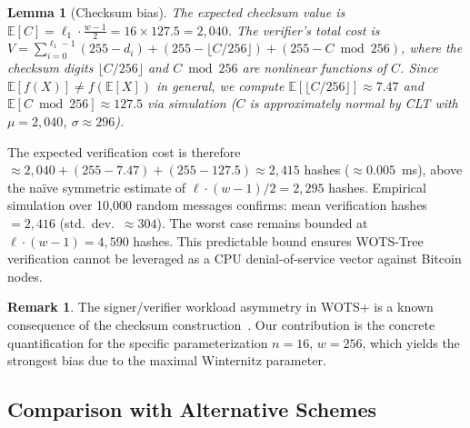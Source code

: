 \documentclass[11pt,a4paper]{article}
\newtheorem{lemma}[theorem]{Lemma}
\theoremstyle{definition}
\newtheorem{remark}[theorem]{Remark}
\begin{document}
\begin{lemma}[Checksum bias]
\label{lem:checksum}
The expected checksum value is $\mathbb{E}[C] = \ell_1 \cdot \frac{w-1}{2} = 16 \times 127.5 = 2{,}040$. The verifier's total cost is $V = \sum_{i=0}^{\ell_1-1}(255 - d_i) + (255 - \lfloor C/256 \rfloor) + (255 - C \bmod 256)$, where the checksum digits $\lfloor C/256 \rfloor$ and $C \bmod 256$ are nonlinear functions of $C$. Since $\mathbb{E}[f(X)] \neq f(\mathbb{E}[X])$ in general, we compute $\mathbb{E}[\lfloor C/256 \rfloor] \approx 7.47$ and $\mathbb{E}[C \bmod 256] \approx 127.5$ via simulation ($C$ is approximately normal by CLT with $\mu = 2{,}040$, $\sigma \approx 296$).
\end{lemma}

The expected verification cost is therefore $\approx 2{,}040 + (255 - 7.47) + (255 - 127.5) \approx 2{,}415$ hashes ($\approx 0.005$~ms), above the na\"ive symmetric estimate of $\ell \cdot (w-1)/2 = 2{,}295$ hashes. Empirical simulation over 10,000 random messages confirms: mean verification hashes $= 2{,}416$ (std.\ dev.\ $\approx 304$). The worst case remains bounded at $\ell \cdot (w - 1) = 4{,}590$ hashes. This predictable bound ensures WOTS-Tree verification cannot be leveraged as a CPU denial-of-service vector against Bitcoin nodes.

\begin{remark}
The signer/verifier workload asymmetry in WOTS+ is a known consequence of the checksum construction~\cite{hulsing2013wots,kudinov2025}. Our contribution is the concrete quantification for the specific parameterization $n = 16$, $w = 256$, which yields the strongest bias due to the maximal Winternitz parameter.
\end{remark}

\subsection{Comparison with Alternative Schemes}
\end{document}
